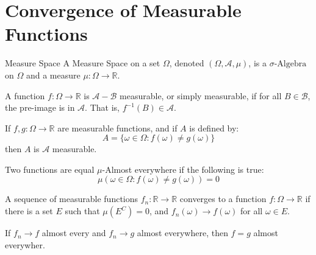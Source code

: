         \section{Convergence of Measurable Functions}
            \begin{ldefinition}{Measure Space}
                A Measure Space on a set $\Omega$, denoted
                $(\Omega,\mathcal{A},\mu)$, is a
                $\sigma\textrm{-Algebra}$ on $\Omega$ and a
                measure $\mu:\Omega\rightarrow\mathbb{R}$.
            \end{ldefinition}
            A function $f:\Omega\rightarrow\mathbb{R}$ is
            $\mathcal{A}-\mathcal{B}$ measurable, or simply
            measurable, if for all $B\in\mathcal{B}$, the
            pre-image is in $\mathcal{A}$. That is,
            $f^{-1}(B)\in\mathcal{A}$.
            \begin{theorem}
                If $f,g:\Omega\rightarrow\mathbb{R}$ are
                measurable functions, and if $A$ is defined by:
                \begin{equation}
                    A=\{\omega\in\Omega:f(\omega)\ne{g}(\omega)\}
                \end{equation}
                then $A$ is $\mathcal{A}$ measurable.
            \end{theorem}
            \begin{definition}
                Two functions are equal $\mu$-Almost everywhere
                if the following is true:
                \begin{equation}
                    \mu(\omega\in\Omega:f(\omega)\ne{g}(\omega))
                    =0
                \end{equation}
            \end{definition}
            \begin{definition}
                A sequence of measurable functions
                $f_{n}:\mathbb{R}\rightarrow\mathbb{R}$ converges
                to a function $f:\Omega\rightarrow\mathbb{R}$
                if there is a set $E$ such that $\mu(E^{C})=0$,
                and $f_{n}(\omega)\rightarrow{f}(\omega)$ for all
                $\omega\in{E}$.
            \end{definition}
            \begin{theorem}
                If $f_{n}\rightarrow{f}$ almost every and
                $f_{n}\rightarrow{g}$ almost everywhere, then
                $f=g$ almost everywher.
            \end{theorem}
